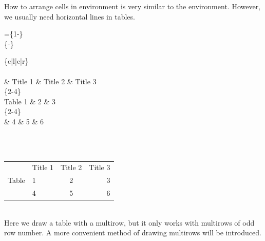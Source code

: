 \begin{frame}
	How to arrange cells in  environment is very similar to the  environment. However, we usually need horizontal lines in tables.
	\begin{command}
		\quad=\quad{}\{1-\}\\
		\{-\}
	\end{command}
	\begin{minipage}{0.45\linewidth}
		\begin{example}
			\{c|l|c|r\}\\
			\qquad {}\\
			\qquad \& Title 1 \& Title 2 \& Title 3 \samplecommand{\textbackslash} \\
			\qquad {}\{2-4\}\\
			\qquad Table 1 \& 2 \& 3 \samplecommand{\textbackslash} \\
			\qquad {}\{2-4\}\\
			\qquad \& 4 \& 5 \& 6 \samplecommand{\textbackslash} \\
			\qquad {}\\
    	\end{example}
	\end{minipage}
	\hfill
    \begin{minipage}{0.5\linewidth}
    	\ \\[0.5em]
    	\begin{tabular}{c|l|c|r}
        	\hline\hline
        	& Title 1 & Title 2 & Title 3 \\
        	\cline{2-4}
        	Table & 1 & 2 & 3 \\
        	\cline{2-4}
        	& 4 & 5 & 6 \\
        	\hline\hline
        \end{tabular}\\[0.5em]
        Here we draw a table with a multirow, but it only works with multirows of odd row number. A more convenient method of drawing multirows will be introduced.
    \end{minipage}
    
\end{frame}

